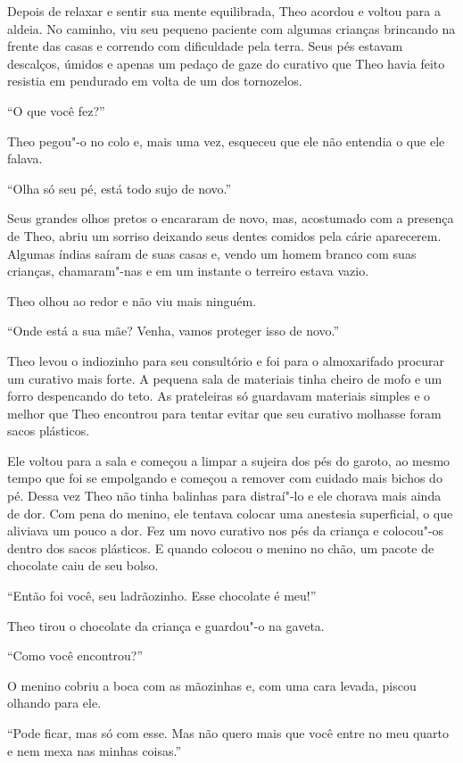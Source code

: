 Depois de relaxar e sentir sua mente equilibrada, Theo acordou e voltou
para a aldeia. No caminho, viu seu pequeno paciente com algumas crianças
brincando na frente das casas e correndo com dificuldade pela terra.
Seus pés estavam descalços, úmidos e apenas um pedaço de gaze do
curativo que Theo havia feito resistia em pendurado em volta de um dos
tornozelos.

``O que você fez?''

Theo pegou"-o no colo e, mais uma vez, esqueceu que ele não entendia o
que ele falava.

``Olha só seu pé, está todo sujo de novo.''

Seus grandes olhos pretos o encararam de novo, mas, acostumado com a
presença de Theo, abriu um sorriso deixando seus dentes comidos pela
cárie aparecerem. Algumas índias saíram de suas casas e, vendo um homem
branco com suas crianças, chamaram"-nas e em um instante o terreiro
estava vazio.

Theo olhou ao redor e não viu mais ninguém.

``Onde está a sua mãe? Venha, vamos proteger isso de novo.''

Theo levou o indiozinho para seu consultório e foi para o almoxarifado
procurar um curativo mais forte. A pequena sala de materiais tinha
cheiro de mofo e um forro despencando do teto. As prateleiras só
guardavam materiais simples e o melhor que Theo encontrou para tentar
evitar que seu curativo molhasse foram sacos plásticos.

Ele voltou para a sala e começou a limpar a sujeira dos pés do garoto,
ao mesmo tempo que foi se empolgando e começou a remover com cuidado mais
bichos do pé. Dessa vez Theo não tinha balinhas para
distraí"-lo e ele chorava mais ainda de dor. Com pena do menino, ele
tentava colocar uma anestesia superficial, o que aliviava um pouco a dor.
Fez um novo curativo nos pés da criança e colocou"-os dentro
dos sacos plásticos. E quando colocou o menino no chão, um pacote de
chocolate caiu de seu bolso.

``Então foi você, seu ladrãozinho. Esse chocolate é meu!''

Theo tirou o chocolate da criança e guardou"-o na gaveta.

``Como você encontrou?''

O menino cobriu a boca com as mãozinhas e, com uma cara levada, piscou
olhando para ele.

``Pode ficar, mas só com esse. Mas não quero mais que você entre no meu
quarto e nem mexa nas minhas coisas.''

